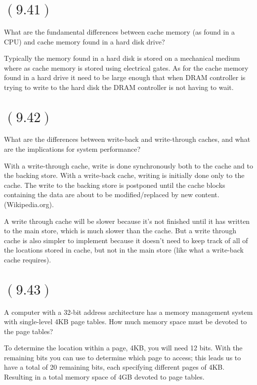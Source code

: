 \documentclass[letterpaper,12pt,titlepage]{article}
\begin{document}
\section*{$(9.41)$} What are the fundamental differences between cache memory (as found in a CPU) and cache memory found in a hard disk drive?

\begin{mdframed}[style=MyFrame]
Typically the memory found in a hard disk is stored on a mechanical medium where as cache memory is stored using electrical gates. As for the cache memory found in a hard drive it need to be large enough that when DRAM controller is trying to write to the hard disk the DRAM controller is not having to wait.
\end{mdframed}

\section*{$(9.42)$} What are the differences between write-back and write-through caches, and what are the implications for system performance? 

\begin{mdframed}[style=MyFrame]
With a write-through cache, write is done synchronously both to the cache and to the backing store.
With a write-back cache, writing is initially done only to the cache. The write to the backing store is postponed until the cache blocks containing the data are about to be modified/replaced by new content. (Wikipedia.org).

A write through cache will be slower because it's not finished until it has written to the main store, which is much slower than the cache.  But a write through cache is also simpler to implement because it doesn't need to keep track of all of the locations stored in cache, but not in the main store (like what a write-back cache requires). 
\end{mdframed}

\section*{$(9.43)$} A computer with a 32-bit address architecture has a memory management system with single-level 4KB page tables. How much memory space must be devoted to the page tables?

\begin{mdframed}[style=MyFrame]
To determine the location within a page, 4KB, you will need 12 bits. With the remaining bits you can use to determine which page to access; this leads us to have a total of 20 remaining bits, each specifying different pages of 4KB. Resulting in a total memory space of 4GB devoted to page tables.
\end{mdframed}
\end{document}
